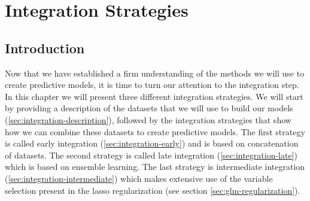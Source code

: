 \chapter{Integration Strategies}
\label{cha:integration}

\section{Introduction}
\label{sec:integration-introduction}
Now that we have established a firm understanding of the methods we will use to create predictive models, it is time to turn our attention to the integration step. In this chapter we will present three different integration strategies. We will start by providing a description of the datasets that we will use to build our models (\ref{sec:integration-description}), followed by the integration strategies that show how we can combine these datasets to create predictive models. The first strategy is called early integration (\ref{sec:integration-early}) and is based on concatenation of datasets. The second strategy is called late integration (\ref{sec:integration-late}) which is based on ensemble learning. The last strategy is intermediate integration (\ref{sec:integration-intermediate}) which makes extensive use of the variable selection present in the lasso regularization (see section \ref{sec:glm-regularization}).

